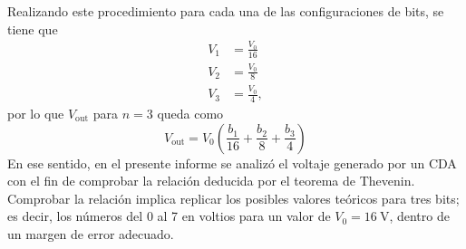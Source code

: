 Realizando este procedimiento para cada una de las configuraciones de bits, se tiene
que
\begin{align*}
	V_1 &= \frac{V_0}{16} \\
	V_2 &= \frac{V_0}{8} \\
	V_3 &= \frac{V_0}{4},
\end{align*}
por lo que $V_{\text{out}}$ para $n=3$ queda como
\begin{equation}\label{eq:out}
	V_{\text{out}} = V_0\left( \frac{b_1}{16} + \frac{b_2}{8} + \frac{b_3}{4}\right)
\end{equation}
En ese sentido, en el presente informe se analizó el voltaje generado por un CDA
con el fin de comprobar la relación deducida por el teorema de Thevenin. Comprobar
la relación implica replicar los posibles valores teóricos para tres bits; es decir,
los números del 0 al 7 en voltios para un valor de $V_0=\qty{16}{\volt}$, dentro de un
margen de error adecuado.